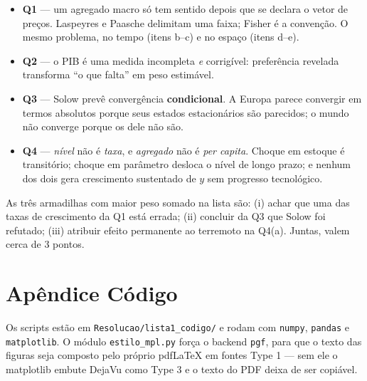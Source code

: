 \documentclass[11pt, a4paper]{article}
\begin{document}
\begin{tcolorbox}[theorybox, title={O que a Lista 1 está realmente testando}]
\small
\begin{itemize}
\item \textbf{Q1} --- um agregado macro só tem sentido depois que se declara o vetor de
      preços. Laspeyres e Paasche delimitam uma faixa; Fisher é a convenção. O mesmo
      problema, no tempo (itens b--c) e no espaço (itens d--e).
\item \textbf{Q2} --- o PIB é uma medida incompleta \emph{e} corrigível: preferência
      revelada transforma ``o que falta'' em peso estimável.
\item \textbf{Q3} --- Solow prevê convergência \textbf{condicional}. A Europa parece
      convergir em termos absolutos porque seus estados estacionários são parecidos; o
      mundo não converge porque os dele não são.
\item \textbf{Q4} --- \emph{nível} não é \emph{taxa}, e \emph{agregado} não é
      \emph{per capita}. Choque em estoque é transitório; choque em parâmetro desloca o
      nível de longo prazo; e nenhum dos dois gera crescimento sustentado de $y$ sem
      progresso tecnológico.
\end{itemize}
As três armadilhas com maior peso somado na lista são: (i) achar que uma das taxas de
crescimento da Q1 está errada; (ii) concluir da Q3 que Solow foi refutado; (iii) atribuir
efeito permanente ao terremoto na Q4(a). Juntas, valem cerca de 3 pontos.
\end{tcolorbox}

\section*{Apêndice \quad Código}

Os scripts estão em \texttt{Resolucao/lista1\_codigo/} e rodam com \texttt{numpy},
\texttt{pandas} e \texttt{matplotlib}. O módulo \texttt{estilo\_mpl.py} força o backend
\texttt{pgf}, para que o texto das figuras seja composto pelo próprio pdf\LaTeX{} em fontes
Type 1 --- sem ele o matplotlib embute DejaVu como Type 3 e o texto do PDF deixa de ser
copiável.
\end{document}

